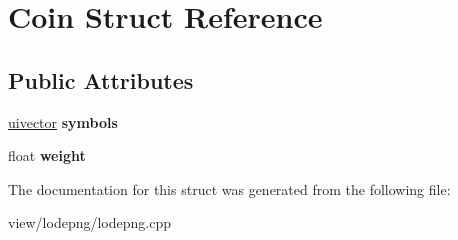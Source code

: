 \hypertarget{struct_coin}{\section{Coin Struct Reference}
\label{struct_coin}
}
\subsection*{Public Attributes}
\begin{DoxyCompactItemize}
\item 
\hypertarget{struct_coin_a1d6bc1176bb9fcbd9ca8c781c92ef432}{\hyperlink{structuivector}{uivector} {\bfseries symbols}}\label{struct_coin_a1d6bc1176bb9fcbd9ca8c781c92ef432}

\item 
\hypertarget{struct_coin_a0427f9a678a9ce031a254f40f06b3669}{float {\bfseries weight}}\label{struct_coin_a0427f9a678a9ce031a254f40f06b3669}

\end{DoxyCompactItemize}


The documentation for this struct was generated from the following file\-:\begin{DoxyCompactItemize}
\item 
view/lodepng/lodepng.\-cpp\end{DoxyCompactItemize}
